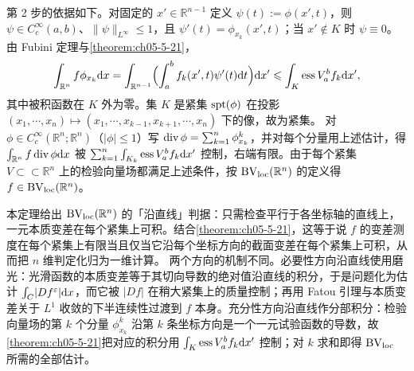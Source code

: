 \documentclass[../../main.tex]{subfiles}%
\begin{document}
第 2 步的依据如下。对固定的 $x'\in\mathbb{R}^{n-1}$ 定义 $\psi(t):=\phi(x',t)$，则 $\psi\in C_c^\infty(a,b)$、$\lVert\psi\rVert_{L^\infty}\leqslant1$，且 $\psi'(t)=\phi_{x_k}(x',t)$；当 $x'\notin K$ 时 $\psi\equiv0$。由 Fubini 定理与\cref{theorem:ch05-5-21}，%
\begin{align*}
\int_{\mathbb{R}^n}f\phi_{x_k}\mathrm{d} x=\int_{\mathbb{R}^{n-1}}\Bigl(\int_a^b f_k(x',t)\psi'(t)\mathrm{d} t\Bigr)\mathrm{d} x'\leqslant\int_K\operatorname{ess}V_a^b f_k\mathrm{d} x',
\end{align*}
其中被积函数在 $K$ 外为零。集 $K$ 是紧集 $\operatorname{spt}(\phi)$ 在投影 $(x_1,\cdots,x_n)\mapsto(x_1,\cdots,x_{k-1},x_{k+1},\cdots,x_n)$ 下的像，故为紧集。%
对 $\phi\in C_c^\infty(\mathbb{R}^n;\mathbb{R}^n)$（$\lvert\phi\rvert\leqslant1$）写 $\operatorname{div}\phi=\sum_{k=1}^n\phi^k_{x_k}$，并对每个分量用上述估计，得 $\int_{\mathbb{R}^n}f\operatorname{div}\phi\mathrm{d} x$ 被 $\sum_{k=1}^n\int_{K_k}\operatorname{ess}V_a^b f_k\mathrm{d} x'$ 控制，右端有限。由于每个紧集 $V\subset\subset\mathbb{R}^n$ 上的检验向量场都满足上述条件，按 $\mathrm{BV}_{\mathrm{loc}}(\mathbb{R}^n)$ 的定义得 $f\in\mathrm{BV}_{\mathrm{loc}}(\mathbb{R}^n)$。

\begin{remark}\label{remark:ch05-thm-5-22-动机}
本定理给出 $\mathrm{BV}_{\mathrm{loc}}(\mathbb{R}^n)$ 的「沿直线」判据：只需检查平行于各坐标轴的直线上，一元本质变差在每个紧集上可积。结合\cref{theorem:ch05-5-21}，这等于说 $f$ 的变差测度在每个紧集上有限当且仅当它沿每个坐标方向的截面变差在每个紧集上可积，从而把 $n$ 维判定化归为一维计算。%
两个方向的机制不同。必要性方向沿直线使用磨光：光滑函数的本质变差等于其切向导数的绝对值沿直线的积分，于是问题化为估计 $\int_C\lvert Df^\varepsilon\rvert\mathrm{d} x$，而它被 $\lvert Df\rvert$ 在稍大紧集上的质量控制；再用 Fatou 引理与本质变差关于 $L^1$ 收敛的下半连续性过渡到 $f$ 本身。充分性方向沿直线作分部积分：检验向量场的第 $k$ 个分量 $\phi^k_{x_k}$ 沿第 $k$ 条坐标方向是一个一元试验函数的导数，故\cref{theorem:ch05-5-21}把对应的积分用 $\int_K\operatorname{ess}V_a^b f_k\mathrm{d} x'$ 控制；对 $k$ 求和即得 $\mathrm{BV}_{\mathrm{loc}}$ 所需的全部估计。%
\end{remark}
\end{document}
